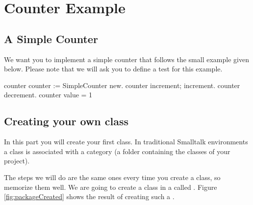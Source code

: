 \ifx\wholebook\relax\else


\fi


\chapter{Counter Example}


\section{A Simple Counter}
We want you to implement a simple counter that follows the small example given
below. Please note that we will ask you to define a test for this example.

\begin{scode}
\stBar counter \stBar
counter := SimpleCounter new.
counter increment; increment.
counter decrement.
counter value = 1
\end{scode}


\section{Creating your own class}
In this part you will create your first class. In traditional Smalltalk environments a class is associated with a category (a folder containing the classes of your project).

 The steps we will do are the same ones every  time you create a class, so memorize them well. We are going to create a class  in a
\category called . Figure \ref{fig:packageCreated} shows the result of creating such a \category.

